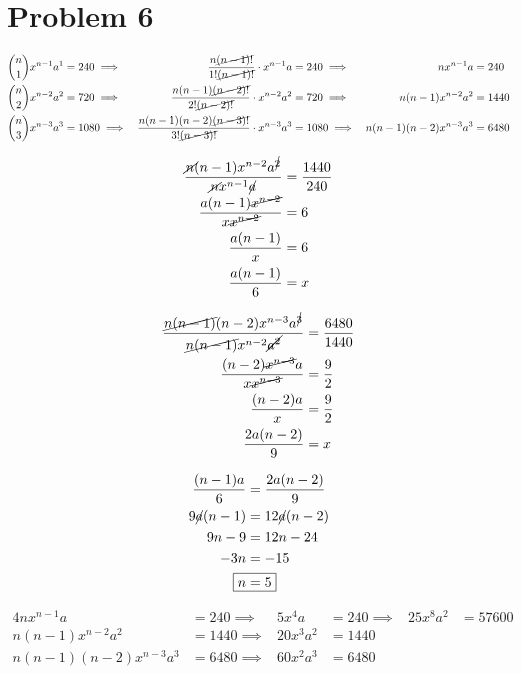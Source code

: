 \documentclass{article}
\begin{document}
\section*{Problem 6}
\begin{alignat*}{3}
	\binom{n}{1}x^{n-1}a^1&=240 \implies&
		\frac{n\cancel{(n-1)!}}{1!\cancel{(n-1)!}}
		\cdot x^{n-1}a&=240 \implies&
		nx^{n-1}a&=240 \\
	\binom{n}{2}x^{n-2}a^2&=720 \implies&
		\frac{n(n-1)\cancel{(n-2)!}}{2!\cancel{(n-2)!}}
		\cdot x^{n-2}a^2&=720 \implies&
		n(n-1)x^{n-2}a^2&=1440 \\
	\binom{n}{3}x^{n-3}a^3&=1080 \implies&
		\frac{n(n-1)(n-2)\cancel{(n-3)!}}{3!\cancel{(n-3)!}}
		\cdot x^{n-3}a^3&=1080 \implies&
		n(n-1)(n-2)x^{n-3}a^3&=6480 
\end{alignat*}

\begin{minipage}[t]{0.33\linewidth}
\begin{align*}
	\frac{\cancel{n}(n-1)x^{n-2}a^{\cancel{2}}}
		{\cancel{n}x^{n-1}\cancel{a}}&=\frac{1440}{240} \\
	\frac{a(n-1)\cancel{x^{n-2}}}{x\cancel{x^{n-2}}}&=6 \\
	\frac{a(n-1)}{x}&=6 \\
	\frac{a(n-1)}{6}&=x
\end{align*}
\end{minipage}
\begin{minipage}[t]{0.33\linewidth}
\begin{align*}
	\frac{\cancel{n(n-1)}(n-2)x^{n-3}a^{\cancel{3}}}
		{\cancel{n(n-1)}x^{n-2}\cancel{a^2}}&=\frac{6480}{1440} \\
	\frac{(n-2)\cancel{x^{n-3}}a}{x\cancel{x^{n-3}}}&=\frac{9}{2} \\
	\frac{(n-2)a}{x}&=\frac{9}{2} \\
	\frac{2a(n-2)}{9}&=x \\
\end{align*}
\end{minipage}
\begin{minipage}[t]{0.33\linewidth}
\begin{align*}
	\frac{(n-1)a}{6}&=\frac{2a(n-2)}{9} \\
	9\cancel{a}(n-1)&=12\cancel{a}(n-2) \\
	9n-9&=12n-24 \\
	-3n&=-15 \\
	\Aboxed{n&=5}
\end{align*}
\end{minipage}
\begin{alignat*}{4}
	nx^{n-1}a&=240 \implies& 5x^4a&=240 \implies& 25x^8a^2&=57600 \\
	n(n-1)x^{n-2}a^2&=1440 \implies& 20x^3a^2&=1440 \\
	n(n-1)(n-2)x^{n-3}a^3&=6480 \implies& 60x^2a^3&=6480
\end{alignat*}
\end{document}
